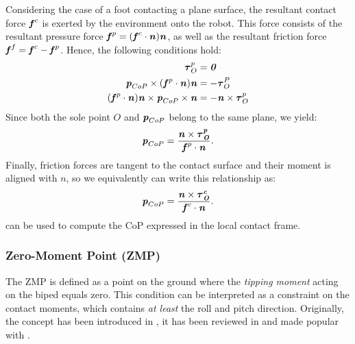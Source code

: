 Considering the case of a foot contacting a plane surface, the resultant contact force $\bm{\mathit{f}}^c$ is exerted by the environment onto the robot. This force consists of the resultant pressure force $\bm{\mathit{f}}^p=(\bm{\mathit{f}}^c\cdot\bm{\mathit{n}})\bm{\mathit{n}}$, as well as the resultant friction force $\bm{\mathit{f}}^f=\bm{\mathit{f}}^c-\bm{\mathit{f}}^p$.
Hence, the following conditions hold:
\begin{align*}
\bm{\mathit{\tau}}_O^p 		&= \bm{\mathit{0}} \\
\bm{\mathit{p}}_{CoP}\times(\bm{\mathit{f}}^p\cdot\bm{\mathit{n}})\bm{\mathit{n}}	&= -\bm{\mathit{\tau}}_O^P \\
(\bm{\mathit{f}}^p\cdot\bm{\mathit{n}})\bm{\mathit{n}}\times\bm{\mathit{p}}_{CoP}\times\bm{\mathit{n}}	&= -\bm{\mathit{n}}\times\bm{\mathit{\tau}}_O^p
\end{align*}
Since both the sole point $O$ and $\bm{\mathit{p}}_{CoP}$ belong to the same plane, we yield:
\begin{equation*}
\bm{\mathit{p}}_{CoP}=\dfrac{\bm{\mathit{n}}\times\bm{\mathit{\bm{\mathit{\tau}}_O^p}}}{\bm{\mathit{f}}^p\cdot\bm{\mathit{n}}}.
\end{equation*}
Finally, friction forces are tangent to the contact surface and their moment is aligned with $n$, so we equivalently can write this relationship as:
\begin{equation}\label{eqn:CoPComputation}
\bm{\mathit{p}}_{CoP}=\dfrac{\bm{\mathit{n}}\times\bm{\mathit{\bm{\mathit{\tau}}_O^c}}}{\bm{\mathit{f}}^c\cdot\bm{\mathit{n}}}.
\end{equation}
 can be used to compute the \gls{CoP} expressed in the local contact frame.

%
\subsubsection{Zero-Moment Point (ZMP)}
The \gls{ZMP} is defined as a point on the ground where the \textit{tipping moment} acting on the biped equals zero. This condition can be interpreted as a constraint on the contact moments, which contains \textit{at least} the roll and pitch direction. Originally, the concept has been introduced in \cite{vukobratovic1972stability}, it has been reviewed in \cite{vukobratovic2004zero} and made popular with \cite{kajita2003biped}.

